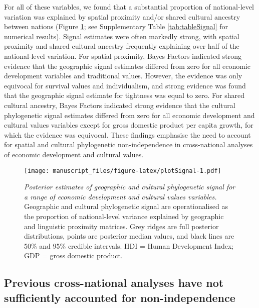 \documentclass[
  man,floatsintext]{apa6}
\begin{document}
For all of these variables, we found that a substantial proportion of national-level variation was explained by spatial proximity and/or shared cultural ancestry between nations (Figure \ref{fig:plotSignal}; see Supplementary Table \ref{tab:tableSignal} for numerical results). Signal estimates were often markedly strong, with spatial proximity and shared cultural ancestry frequently explaining over half of the national-level variation. For spatial proximity, Bayes Factors indicated strong evidence that the geographic signal estimates differed from zero for all economic development variables and traditional values. However, the evidence was only equivocal for survival values and individualism, and strong evidence was found that the geographic signal estimate for tightness was equal to zero. For shared cultural ancestry, Bayes Factors indicated strong evidence that the cultural phylogenetic signal estimates differed from zero for all economic development and cultural values variables except for gross domestic product per capita growth, for which the evidence was equivocal. These findings emphasise the need to account for spatial and cultural phylogenetic non-independence in cross-national analyses of economic development and cultural values.



\begin{figure}
\centering
\texttt{[image: manuscript\_files/figure-latex/plotSignal-1.pdf]}
\caption{\label{fig:plotSignal}\emph{Posterior estimates of geographic and cultural phylogenetic signal for a range of economic development and cultural values variables.} Geographic and cultural phylogenetic signal are operationalised as the proportion of national-level variance explained by geographic and linguistic proximity matrices. Grey ridges are full posterior distributions, points are posterior median values, and black lines are 50\% and 95\% credible intervals. HDI = Human Development Index; GDP = gross domestic product.}
\end{figure}

\hypertarget{previous-cross-national-analyses-have-not-sufficiently-accounted-for-non-independence}{%
\subsection{Previous cross-national analyses have not sufficiently accounted for non-independence}\label{previous-cross-national-analyses-have-not-sufficiently-accounted-for-non-independence}}
\end{document}
